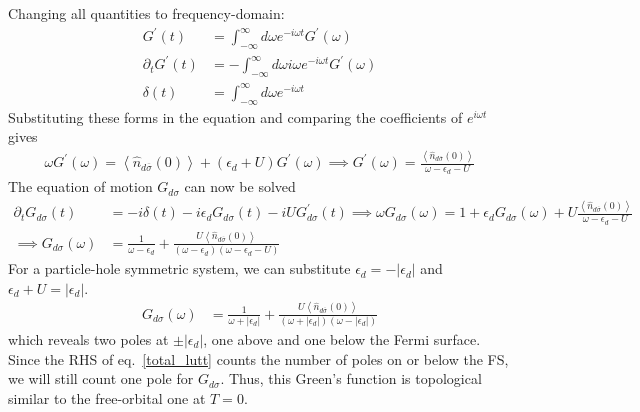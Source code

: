 \documentclass[10pt]{report}
\numberwithin{equation}{section}
\begin{document}
Changing all quantities to frequency-domain:
\begin{equation}\begin{aligned}
	G^\prime(t) &= \int_{-\infty}^\infty d\omega e^{-i\omega t} G^\prime(\omega)\\
	\partial_t G^\prime(t) &= -\int_{-\infty}^\infty d\omega i \omega e^{-i\omega t} G^\prime(\omega)\\
	\delta(t) &= \int_{-\infty}^\infty d\omega e^{-i\omega t}
\end{aligned}\end{equation}
Substituting these forms in the equation and comparing the coefficients of \(e^{i\omega t}\) gives
\begin{equation}\begin{aligned}
	 \omega G^\prime(\omega) =  \left< \hat n_{d\overline\sigma}(0)\right> + \left( \epsilon_d + U \right) G^\prime(\omega)\implies G^\prime(\omega) = \frac{\left< \hat n_{d\overline\sigma}(0)\right>}{\omega - \epsilon_d - U}
\end{aligned}\end{equation}
The equation of motion \(G_{d\sigma}\) can now be solved
\begin{equation}\begin{aligned}
	\partial_t G_{d\sigma}(t) &= -i \delta(t) - i\epsilon_d G_{d\sigma}(t) - iU G^\prime_{d\sigma}(t) \implies \omega G_{d\sigma}(\omega) = 1 + \epsilon_d G_{d\sigma}(\omega) + U\frac{\left< \hat n_{d\overline\sigma}(0)\right>}{\omega - \epsilon_d - U}\\
	\implies G_{d\sigma}(\omega) &= \frac{1}{\omega - \epsilon_d} + \frac{U\left< \hat n_{d\overline\sigma}(0)\right>}{\left( \omega - \epsilon_d \right) \left(\omega - \epsilon_d - U\right)}
\end{aligned}\end{equation}
For a particle-hole symmetric system, we can substitute \(\epsilon_d = -|\epsilon_d|\) and \(\epsilon_d + U = |\epsilon_d|\).
\begin{equation}\begin{aligned}
	G_{d\sigma}(\omega) &= \frac{1}{\omega + |\epsilon_d|} + \frac{U\left< \hat n_{d\overline\sigma}(0)\right>}{\left( \omega + |\epsilon_d| \right) \left(\omega - |\epsilon_d|\right)}
\end{aligned}\end{equation}
which reveals two poles at \(\pm |\epsilon_d|\), one above and one below the Fermi surface. Since the RHS of eq.~\eqref{total_lutt} counts the number of poles on or below the FS, we will still count one pole for \(G_{d\sigma}\). Thus, this Green's function is topological similar to the free-orbital one at \(T=0\).
\end{document}
